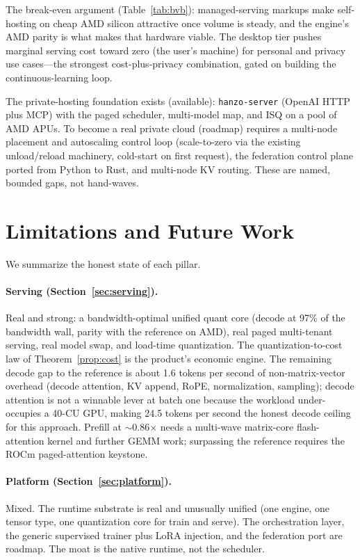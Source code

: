 \documentclass[11pt]{article}
\begin{document}
The break-even argument (Table~\ref{tab:bvb}): managed-serving markups make self-hosting on cheap AMD silicon attractive once volume is steady, and the engine's AMD parity is what makes that hardware viable. The desktop tier pushes marginal serving cost toward zero (the user's machine) for personal and privacy use cases---the strongest cost-plus-privacy combination, gated on building the continuous-learning loop.

The private-hosting foundation exists (available): \texttt{hanzo-server} (OpenAI HTTP plus MCP) with the paged scheduler, multi-model map, and ISQ on a pool of AMD APUs. To become a real private cloud (roadmap) requires a multi-node placement and autoscaling control loop (scale-to-zero via the existing unload/reload machinery, cold-start on first request), the federation control plane ported from Python to Rust, and multi-node KV routing. These are named, bounded gaps, not hand-waves.

\section{Limitations and Future Work}
\label{sec:limitations}

We summarize the honest state of each pillar.

\paragraph{Serving (Section~\ref{sec:serving}).} Real and strong: a bandwidth-optimal unified quant core (decode at 97\% of the bandwidth wall, parity with the reference on AMD), real paged multi-tenant serving, real model swap, and load-time quantization. The quantization-to-cost law of Theorem~\ref{prop:cost} is the product's economic engine. The remaining decode gap to the reference is about 1.6 tokens per second of non-matrix-vector overhead (decode attention, KV append, RoPE, normalization, sampling); decode attention is not a winnable lever at batch one because the workload under-occupies a 40-CU GPU, making 24.5 tokens per second the honest decode ceiling for this approach. Prefill at $\sim$0.86$\times$ needs a multi-wave matrix-core flash-attention kernel and further GEMM work; surpassing the reference requires the ROCm paged-attention keystone.

\paragraph{Platform (Section~\ref{sec:platform}).} Mixed. The runtime substrate is real and unusually unified (one engine, one tensor type, one quantization core for train and serve). The orchestration layer, the generic supervised trainer plus LoRA injection, and the federation port are roadmap. The moat is the native runtime, not the scheduler.
\end{document}
